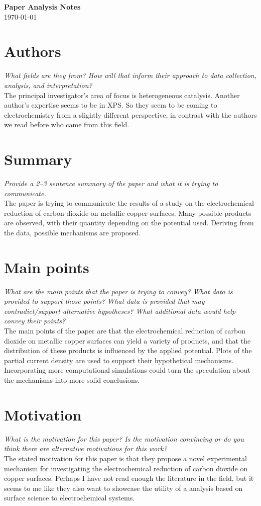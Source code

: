 \documentclass[12pt]{article}
\begin{document}
\begin{center}
    {\LARGE \textbf{Paper Analysis Notes}}\\[6pt]
    \today
\end{center}


\section*{Authors}
\textit{What fields are they from? How will that inform their approach to data collection, analysis, and interpretation?}\\[4pt]
The principal investigator's area of focus is heterogeneous catalysis. Another author's expertise seems to be in XPS. So they seem to be coming to electrochemistry from a slightly different perspective, in contrast with the authors we read before who came from this field.

\section*{Summary}
\textit{Provide a 2--3 sentence summary of the paper and what it is trying to communicate.}\\[4pt]
The paper is trying to communicate the results of a study on the electrochemical reduction of carbon dioxide on metallic copper surfaces. Many possible products are observed, with their quantity depending on the potential used. Deriving from the data, possible mechanisms are proposed.

\section*{Main points}
\textit{What are the main points that the paper is trying to convey? What data is provided to support those points? What data is provided that may contradict/support alternative hypotheses? What additional data would help convey their points?}\\[4pt]
The main points of the paper are that the electrochemical reduction of carbon dioxide on metallic copper surfaces can yield a variety of products, and that the distribution of these products is influenced by the applied potential. Plots of the partial current density are used to support their hypothetical mechanisms. Incorporating more computational simulations could turn the speculation about the mechanisms into more solid conclusions.

\section*{Motivation}
\textit{What is the motivation for this paper? Is the motivation convincing or do you think there are alternative motivations for this work?}\\[4pt]
The stated motivation for this paper is that they propose a novel experimental mechanism for investigating the electrochemical reduction of carbon dioxide on copper surfaces. Perhaps I have not read enough the literature in the field, but it seems to me like they also want to showcase the utility of a analysis based on surface science to electrochemical systems.
\end{document}
